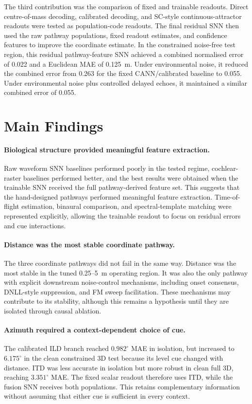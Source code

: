The third contribution was the comparison of fixed and trainable readouts. Direct centre-of-mass decoding, calibrated decoding, and SC-style continuous-attractor readouts were tested as population-code readouts. The final residual SNN then used the raw pathway populations, fixed readout estimates, and confidence features to improve the coordinate estimate. In the constrained noise-free test region, this residual pathway-feature SNN achieved a combined normalised error of 0.022 and a Euclidean MAE of 0.125~m. Under environmental noise, it reduced the combined error from 0.263 for the fixed CANN/calibrated baseline to 0.055. Under environmental noise plus controlled delayed echoes, it maintained a similar combined error of 0.055.

\section{Main Findings}

\paragraph{Biological structure provided meaningful feature extraction.} Raw waveform SNN baselines performed poorly in the tested regime, cochlear-raster baselines performed better, and the best results were obtained when the trainable SNN received the full pathway-derived feature set. This suggests that the hand-designed pathways performed meaningful feature extraction. Time-of-flight estimation, binaural comparison, and spectral-template matching were represented explicitly, allowing the trainable readout to focus on residual errors and cue interactions.

\paragraph{Distance was the most stable coordinate pathway.} The three coordinate pathways did not fail in the same way. Distance was the most stable in the tuned 0.25--5~m operating region. It was also the only pathway with explicit downstream noise-control mechanisms, including onset consensus, DNLL-style suppression, and FM sweep facilitation. These mechanisms may contribute to its stability, although this remains a hypothesis until they are isolated through causal ablation.

\paragraph{Azimuth required a context-dependent choice of cue.} The calibrated ILD branch reached $0.982^\circ$ MAE in isolation, but increased to $6.175^\circ$ in the clean constrained 3D test because its level cue changed with distance. ITD was less accurate in isolation but more robust in clean full 3D, reaching $3.351^\circ$ MAE. The fixed scalar readout therefore uses ITD, while the fusion SNN receives both populations. This retains complementary information without assuming that either cue is sufficient in every context.

